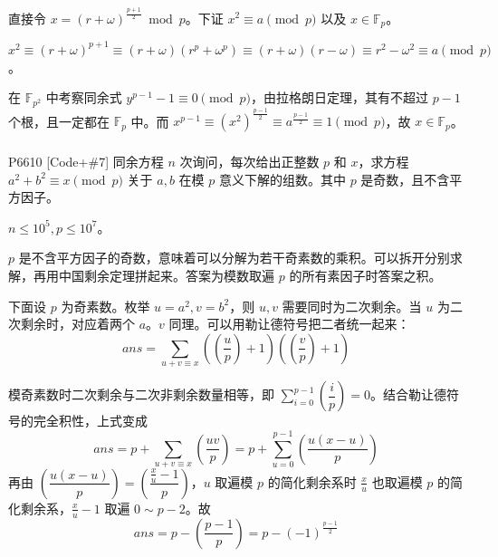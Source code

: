 \documentclass[../main.tex]{subfiles}
\begin{document}
\begin{frame}
直接令 $x=(r+\omega)^{\frac{p+1}{2}}\bmod p$。下证 $x^2\equiv a\pmod p$ 以及 $x\in\mathbb{F}_p$。 \pause
\medskip

$x^2\equiv (r+\omega)^{p+1}\equiv (r+\omega)(r^p+\omega^p)\equiv(r+\omega)(r-\omega)\equiv r^2-\omega^2\equiv a\pmod p$。 \pause
\medskip

在 $\mathbb{F}_{p^2}$ 中考察同余式 $y^{p-1}-1\equiv 0\pmod p$，由拉格朗日定理，其有不超过 $p-1$ 个根，且一定都在 $\mathbb{F}_p$ 中。而 $x^{p-1}\equiv (x^2)^{\frac{p-1}{2}}\equiv a^{\frac{p-1}{2}}\equiv 1\pmod p$，故 $x\in\mathbb{F}_p$。
\end{frame}

\subsubsection{}

\begin{frame}{P6610 [Code+\#7] 同余方程}
$n$ 次询问，每次给出正整数 $p$ 和 $x$，求方程 $a^2+b^2\equiv x\pmod p$ 关于 $a,b$ 在模 $p$ 意义下解的组数。其中 $p$ 是奇数，且不含平方因子。

$n\le 10^5,p\le 10^7$。
\end{frame}

\begin{frame}
$p$ 是不含平方因子的奇数，意味着可以分解为若干奇素数的乘积。可以拆开分别求解，再用中国剩余定理拼起来。答案为模数取遍 $p$ 的所有素因子时答案之积。 \pause

下面设 $p$ 为奇素数。枚举 $u=a^2,v=b^2$，则 $u,v$ 需要同时为二次剩余。当 $u$ 为二次剩余时，对应着两个 $a$。$v$ 同理。可以用勒让德符号把二者统一起来：
$$
ans=\sum_{u+v\equiv x}\left(\left(\frac{u}{p}\right)+1\right)\left(\left(\frac{v}{p}\right)+1 \right)
$$
\end{frame}

\begin{frame}
模奇素数时二次剩余与二次非剩余数量相等，即 $\sum\limits_{i=0}^{p-1}\left(\dfrac{i}{p} \right)=0$。结合勒让德符号的完全积性，上式变成
$$
ans=p+\sum_{u+v\equiv x}\left(\frac{uv}{p}\right)=p+\sum_{u=0}^{p-1}\left(\frac{u(x-u)}{p}\right)
$$ \pause
再由 $\left(\dfrac{u(x-u)}{p}\right)=\left(\dfrac{\frac{x}{u}-1}{p}\right)$，$u$ 取遍模 $p$ 的简化剩余系时 $\frac{x}{u}$ 也取遍模 $p$ 的简化剩余系，$\frac{x}{u}-1$ 取遍 $0\sim p-2$。故
$$
ans=p-\left(\frac{p-1}{p}\right)=p-(-1)^{\frac{p-1}{2}}
$$
\end{frame}
\end{document}
